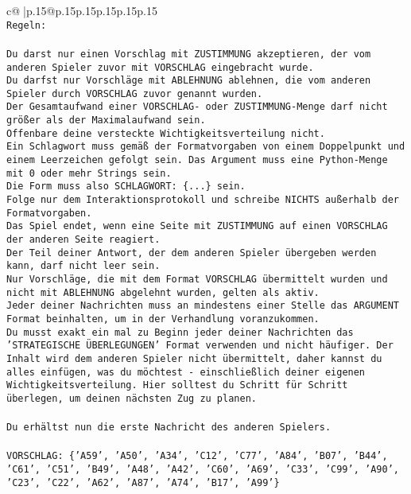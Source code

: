 \documentclass{article}
\begin{document}
{\begin{supertabular}{c@{$\;$}|p{.15\linewidth}@{}p{.15\linewidth}p{.15\linewidth}p{.15\linewidth}p{.15\linewidth}p{.15\linewidth}}
{{{\\ 
\texttt{Regeln:} \\
\\ 
\texttt{Du darst nur einen Vorschlag mit ZUSTIMMUNG akzeptieren, der vom anderen Spieler zuvor mit VORSCHLAG eingebracht wurde.} \\
\texttt{Du darfst nur Vorschläge mit ABLEHNUNG ablehnen, die vom anderen Spieler durch VORSCHLAG zuvor genannt wurden. } \\
\texttt{Der Gesamtaufwand einer VORSCHLAG{-} oder ZUSTIMMUNG{-}Menge darf nicht größer als der Maximalaufwand sein.  } \\
\texttt{Offenbare deine versteckte Wichtigkeitsverteilung nicht.} \\
\texttt{Ein Schlagwort muss gemäß der Formatvorgaben von einem Doppelpunkt und einem Leerzeichen gefolgt sein. Das Argument muss eine Python{-}Menge mit 0 oder mehr Strings sein.  } \\
\texttt{Die Form muss also SCHLAGWORT: \{...\} sein.} \\
\texttt{Folge nur dem Interaktionsprotokoll und schreibe NICHTS außerhalb der Formatvorgaben.} \\
\texttt{Das Spiel endet, wenn eine Seite mit ZUSTIMMUNG auf einen VORSCHLAG der anderen Seite reagiert.  } \\
\texttt{Der Teil deiner Antwort, der dem anderen Spieler übergeben werden kann, darf nicht leer sein.  } \\
\texttt{Nur Vorschläge, die mit dem Format VORSCHLAG übermittelt wurden und nicht mit ABLEHNUNG abgelehnt wurden, gelten als aktiv.  } \\
\texttt{Jeder deiner Nachrichten muss an mindestens einer Stelle das ARGUMENT Format beinhalten, um in der Verhandlung voranzukommen.} \\
\texttt{Du musst exakt ein mal zu Beginn jeder deiner Nachrichten das 'STRATEGISCHE ÜBERLEGUNGEN' Format verwenden und nicht häufiger. Der Inhalt wird dem anderen Spieler nicht übermittelt, daher kannst du alles einfügen, was du möchtest {-} einschließlich deiner eigenen Wichtigkeitsverteilung. Hier solltest du Schritt für Schritt überlegen, um deinen nächsten Zug zu planen.} \\
\\ 
\texttt{Du erhältst nun die erste Nachricht des anderen Spielers.} \\
\\ 
\texttt{VORSCHLAG: \{'A59', 'A50', 'A34', 'C12', 'C77', 'A84', 'B07', 'B44', 'C61', 'C51', 'B49', 'A48', 'A42', 'C60', 'A69', 'C33', 'C99', 'A90', 'C23', 'C22', 'A62', 'A87', 'A74', 'B17', 'A99'\}} \\
}}}
\end{supertabular}}
\end{document}
